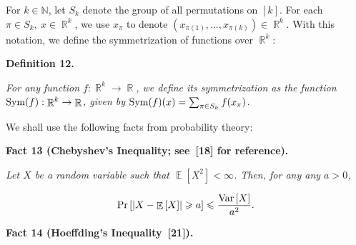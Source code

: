 For $k\in\mathbb{N}$, let $S_{k}$ denote the group of all permutations on $[k]$.
For each $\pi\in S_{k},\ x\in\mathop{\mathbb{R}}^{k}$, we use $x_{\pi}$ to denote $\left(x_{\pi(1)},\dots,x_{\pi(k)}\right)\in\mathop{\mathbb{R}}^{k}$.
With this notation, we define the symmetrization of functions over $\mathop{\mathbb{R}}^{k}$:\par





\par\medskip\noindent\textbf{
\textbf{Definition 12}\textbf{.}
}\par



\emph{For any function $f:\mathop{\mathbb{R}}^{k}\to\mathop{\mathbb{R}}$, we define its symmetrization as the function $\textnormal{Sym}(f):\mathop{\mathbb{R}}^{k}\to\mathop{\mathbb{R}}$, given by $\textnormal{Sym}(f)(x)=\sum_{\pi\in S_{k}}f(x_{\pi})$.}\par






We shall use the following facts from probability theory:\par





\par\medskip\noindent\textbf{
\textbf{Fact 13}\textbf{ }(Chebyshev’s Inequality; see [18] for reference)\textbf{.}
}\par



\emph{Let $X$ be a random variable such that $\mathop{\mathbb{E}}\left[X^{2}\right]<\infty$.
Then, for any any $a>0$,}\par


\[\begin{gathered}
\Pr\left[\left|X-\mathop{\mathbb{E}}\left[X\right]\right|\geqslant a\right]\leqslant\frac{\textnormal{Var}\left[X\right]}{a^{2}}.
\end{gathered}\]







\par\medskip\noindent\textbf{
\textbf{Fact 14}\textbf{ }(Hoeffding’s Inequality [21])\textbf{.}
}\par



